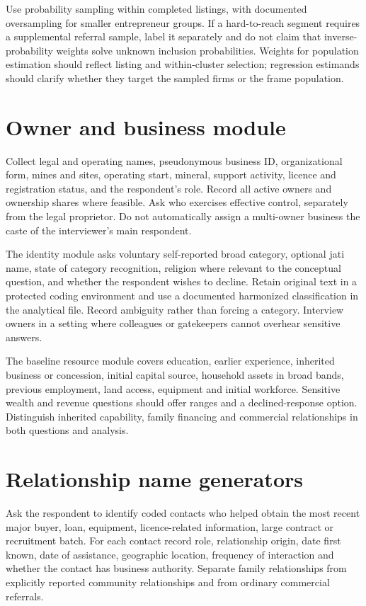 \documentclass[11pt,a4paper]{report}
\begin{document}
Use probability sampling within completed listings, with documented oversampling for smaller entrepreneur groups. If a hard-to-reach segment requires a supplemental referral sample, label it separately and do not claim that inverse-probability weights solve unknown inclusion probabilities. Weights for population estimation should reflect listing and within-cluster selection; regression estimands should clarify whether they target the sampled firms or the frame population.

\section{Owner and business module}
Collect legal and operating names, pseudonymous business ID, organizational form, mines and sites, operating start, mineral, support activity, licence and registration status, and the respondent's role. Record all active owners and ownership shares where feasible. Ask who exercises effective control, separately from the legal proprietor. Do not automatically assign a multi-owner business the caste of the interviewer's main respondent.

The identity module asks voluntary self-reported broad category, optional jati name, state of category recognition, religion where relevant to the conceptual question, and whether the respondent wishes to decline. Retain original text in a protected coding environment and use a documented harmonized classification in the analytical file. Record ambiguity rather than forcing a category. Interview owners in a setting where colleagues or gatekeepers cannot overhear sensitive answers.

The baseline resource module covers education, earlier experience, inherited business or concession, initial capital source, household assets in broad bands, previous employment, land access, equipment and initial workforce. Sensitive wealth and revenue questions should offer ranges and a declined-response option. Distinguish inherited capability, family financing and commercial relationships in both questions and analysis.

\section{Relationship name generators}
Ask the respondent to identify coded contacts who helped obtain the most recent major buyer, loan, equipment, licence-related information, large contract or recruitment batch. For each contact record role, relationship origin, date first known, date of assistance, geographic location, frequency of interaction and whether the contact has business authority. Separate family relationships from explicitly reported community relationships and from ordinary commercial referrals.
\end{document}
